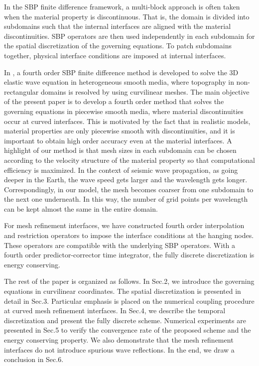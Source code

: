 In the SBP finite difference framework, a multi-block approach is often taken when the material property is discontinuous. That is, the domain is divided into subdomains such that the internal interfaces are aligned with the material discontinuities. SBP operators are then used independently in each subdomain for the spatial discretization of the governing equations. To patch subdomains together, physical interface conditions are imposed at internal interfaces. 

In \cite{petersson2015wave}, a fourth order SBP finite difference method is developed to solve the 3D elastic wave equation in heterogeneous smooth media, where topography in non-rectangular domains is resolved by using curvilinear meshes. The main objective of the present paper is to develop a fourth order method that solves the governing equations in piecewise smooth media, where material discontinuities occur at curved interfaces. This is motivated by the fact that in realistic models, material properties are only piecewise smooth with discontinuities, and it is important to obtain high order accuracy even at the material interfaces. A highlight of our method is that mesh sizes in each subdomain can be chosen according to the velocity structure of the material property so that computational efficiency is maximized. In the context of seismic wave propagation, as going deeper in the Earth, the wave speed gets larger and the wavelength gets longer. Correspondingly, in our model, the mesh becomes coarser from one subdomain to the next one underneath. In this way, the number of grid points per wavelength can be kept almost the same in the entire domain. 

For mesh refinement interfaces, we have constructed fourth order interpolation and restriction operators to impose the interface conditions at the hanging nodes. These operators are compatible with the underlying SBP operators. With a fourth order predictor-corrector time integrator, the fully discrete discretization is energy conserving. 

The rest of the paper is organized as follows. In Sec.2, we introduce the governing equations in curvilinear coordinates. The spatial discretization is presented in detail in Sec.3. Particular emphasis is placed on the numerical coupling procedure at curved mesh refinement interfaces. In Sec.4, we describe the temporal discretization and present the fully discrete scheme. Numerical experiments are presented in Sec.5 to verify the convergence rate of the proposed scheme and the energy conserving property. We also demonstrate that the mesh refinement interfaces do not introduce spurious wave reflections. In the end, we draw a conclusion in Sec.6. 
